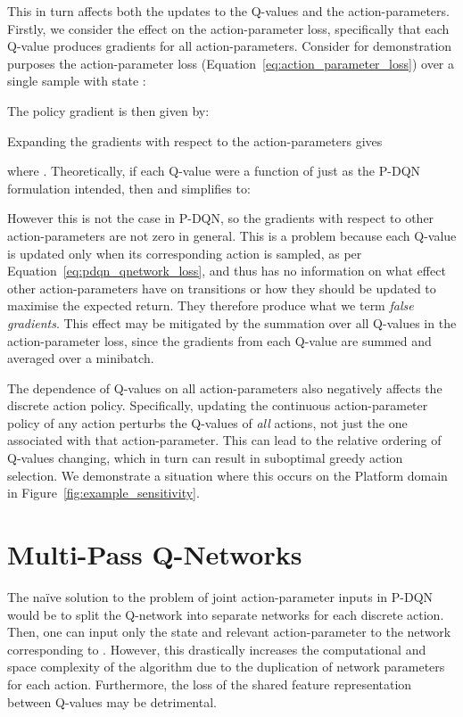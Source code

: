 \documentclass{article}
\def\PDQN*{P\nobreakdash-DQN}
\begin{document}
This in turn affects both the updates to the Q-values and the action-parameters. Firstly, we consider the effect on the action-parameter loss, specifically that each Q-value produces gradients for all action-parameters. Consider for demonstration purposes the action-parameter loss (Equation~\ref{eq:action_parameter_loss}) over a single sample with state :

The policy gradient is then given by:

Expanding the gradients with respect to the action-parameters gives

where . Theoretically, if each Q-value were a function of just  as the \PDQN* formulation intended, then \mbox{} and  simplifies to:

However this is not the case in \PDQN*, so the gradients with respect to other action-parameters  are not zero in general. This is a problem because each Q-value is updated only when its corresponding action is sampled, as per Equation~\ref{eq:pdqn_qnetwork_loss}, and thus has no information on what effect other action-parameters  have on transitions or how they should be updated to maximise the expected return. They therefore produce what we term \emph{false gradients}. This effect may be mitigated by the summation over all Q-values in the action-parameter loss, since the gradients from each Q-value are summed and averaged over a minibatch.

The dependence of Q-values on all action-parameters also negatively affects the discrete action policy. Specifically, updating the continuous action-parameter policy of any action perturbs the Q-values of \emph{all} actions,  not just the one associated with that action-parameter. This can lead to the relative ordering of Q-values changing, which in turn can result in suboptimal greedy action selection. We demonstrate a situation where this occurs on the Platform domain in Figure~\ref{fig:example_sensitivity}.


\section{Multi-Pass Q-Networks}

The na\"ive solution to the problem of joint action-parameter inputs in \PDQN* would be to split the Q-network into separate networks for each discrete action. Then, one can input only the state and relevant action-parameter  to the network corresponding to . However, this drastically increases the computational and space complexity of the algorithm due to the duplication of network parameters for each action. Furthermore, the loss of the shared feature representation between Q-values may be detrimental.
\end{document}
